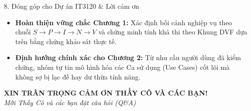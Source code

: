 \documentclass[aspectratio=169, 10pt]{beamer}
\begin{document}
\begin{frame}{8. Đóng góp cho Dự án IT3120 \& Lời cảm ơn}
    \begin{tcolorbox}[colback=CardBg, colframe=ThemeNavy, title=Giá trị Đóng góp cho Đề tài Lớn IT3120]
        \small
        \begin{itemize}
            \item \textbf{Hoàn thiện vững chắc Chương 1:} Xác định bối cảnh nghiệp vụ theo chuỗi $S \to P \to I \to N \to V$ và chứng minh tính khả thi theo Khung DVF dựa trên bằng chứng khảo sát thực tế.
            \item \textbf{Định hướng chính xác cho Chương 2:} Từ nhu cầu người dùng đã kiểm chứng, nhóm tự tin mô hình hóa các Ca sử dụng (Use Cases) cốt lõi mà không sợ bị lạc đề hay dư thừa tính năng.
        \end{itemize}
    \end{tcolorbox}
    
    \vspace{0.35cm}
    \begin{center}
        \large \textbf{\textcolor{ThemeNavy}{XIN TRÂN TRỌNG CẢM ƠN THẦY CÔ VÀ CÁC BẠN!}}\\
        \vspace{0.15cm}
        \normalsize \textit{Mời Thầy Cô và các bạn đặt câu hỏi (Q\&A)}
    \end{center}
\end{frame}
\end{document}
